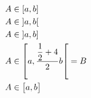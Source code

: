 \documentclass[a4paper,10pt]{article}
\begin{document}

\begin{align*}
    & A \in \interval{a}{b} \\
    & A \in \interval[open]{a}{b} \\
    & A \in \interval[open left]{a}{b} \\
    & A \in \interval[open right, scaled]{a}{\frac{\dfrac12 + 4}2b} = B \\
    & A \in \interval[scaled=\big]{a}{b}
\end{align*}
\end{document}
